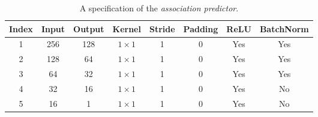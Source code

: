 \documentclass[acmsmall]{acmart}
\begin{document}
\begin{table}[t]
	\centering
	\tabcolsep=3.5pt
	\caption{A specification of the \emph{association predictor}. 
	}
	\label{tab:compression_net}
	\centering
	\setlength{\tabcolsep}{3.5pt}
	\begin{tabular}{cccccccc}
		\hline
		\hline
		{Index} & {Input} & {Output} & {Kernel} & {Stride} & {Padding} & {ReLU} & {BatchNorm} \\
		\hline
		1     & 256  & 128  	& $1 \times 1$ 	& 1 & 0 &	Yes	&	Yes\\
		2     & 128   & 64   	& $1 \times 1$	& 1 & 0 &	Yes	&	Yes\\
		3     & 64   & 32   	& $1 \times 1$ 	& 1 & 0 &	Yes	&	Yes\\
		4     & 32   & 16   	& $1 \times 1$ 	& 1 & 0 &	Yes	&	No\\
		5    & 16    & 1    	& $1 \times 1$ 	& 1 & 0 &	Yes	&	No\\
		\hline
		\hline
	\end{tabular}%
\end{table}%

%
%
\end{document}
